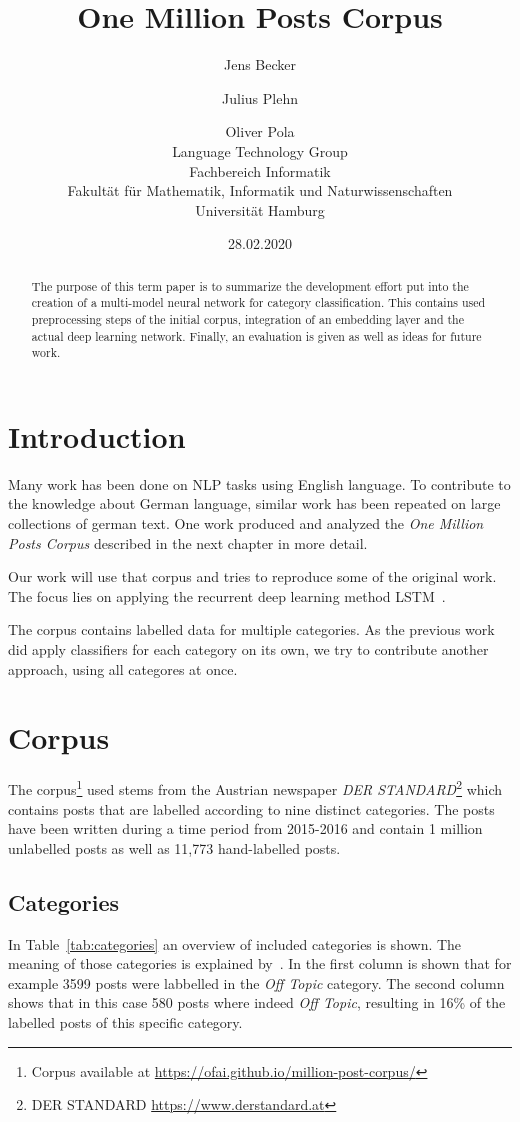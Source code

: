 \documentclass[11pt,a4paper]{article}
\title{One Million Posts Corpus}
\author{Jens Becker \and Julius Plehn \and Oliver Pola \\ 
	Language Technology Group \\
	Fachbereich Informatik \\
	Fakultät für Mathematik, Informatik und Naturwissenschaften \\
	Universität Hamburg
}
\date{28.02.2020}
\begin{document}
\maketitle
\begin{abstract}
The purpose of this term paper is to summarize the development effort put into the creation of a multi-model neural network for category classification. This contains used preprocessing steps of the initial corpus, integration of an embedding layer and the actual deep learning network. Finally, an evaluation is given as well as ideas for future work. 

 
\end{abstract}

\section{Introduction}

Many work has been done on NLP tasks using English language.
To contribute to the knowledge about German language, similar work has been repeated on large collections of german text.
One work produced and analyzed the \textit{One Million Posts Corpus} described in the next chapter in more detail.~\cite{Schabus17, Schabus18}

Our work will use that corpus and tries to reproduce some of the original work.
The focus lies on applying the recurrent deep learning method LSTM~\cite{lstm}.

The corpus contains labelled data for multiple categories.
As the previous work did apply classifiers for each category on its own, we try to contribute another approach, using all categores at once.


\section{Corpus}
The corpus\footnote{Corpus available at \url{https://ofai.github.io/million-post-corpus/}} used stems from the Austrian newspaper \textit{DER STANDARD}\footnote{DER STANDARD \url{https://www.derstandard.at}} which contains posts that are labelled according to nine distinct categories. The posts have been written during a time period from 2015-2016 and contain 1 million unlabelled posts as well as 11,773 hand-labelled posts.


\subsection{Categories}
In Table~\ref{tab:categories} an overview of included categories is shown. The meaning of those categories is explained by~.
In the first column is shown that for example 3599 posts were labbelled in the \textit{Off Topic} category. 
The second column shows that in this case 580 posts where indeed \textit{Off Topic}, resulting in 16\% of the labelled posts of this specific category. 
\end{document}
